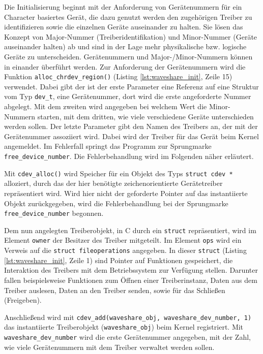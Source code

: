 Die Initialisierung beginnt mit der Anforderung von Gerätenummern für ein Character basiertes Gerät, die dazu genutzt werden den zugehörigen Treiber zu identifizieren sowie die einzelnen Geräte auseinander zu halten. Sie lösen das Konzept von Major-Nummer (Treiberidentifikation) und Minor-Nummer (Geräte auseinander halten) ab und sind in der Lage mehr physikalische bzw. logische Geräte zu unterscheiden. Gerätenummern und Major-/Minor-Nummern können in einander überführt werden. Zur Anforderung der Gerätenummern wird die Funktion \texttt{alloc_chrdev_region()} (Listing \ref{lst:waveshare_init}, Zeile 15) verwendet. Dabei gibt der ist der erste Parameter eine Referenz auf eine Struktur vom Typ \texttt{dev\_t}, eine Gerätenummer, dort wird die erste angeforderte Nummer abgelegt. Mit dem zweiten wird angegeben bei welchem Wert die Minor-Nummern starten, mit dem dritten, wie viele verschiedene Geräte unterschieden werden sollen. Der letzte Parameter gibt den Namen des Treibers an, der mit der Gerätenummer assoziiert wird. Dabei wird der Treiber für das Gerät beim Kernel angemeldet. Im Fehlerfall springt das Programm zur Sprungmarke \texttt{free_device_number}. Die Fehlerbehandlung wird im Folgenden näher erläutert.

Mit \texttt{cdev_alloc()} wird Speicher für ein Objekt des Typs \texttt{struct cdev *} alloziert, durch das der hier benötigte zeichenorientierte Gerätetreiber repräsentiert wird. Wird hier nicht der geforderte Pointer auf das instantiierte Objekt zurückgegeben, wird die Fehlerbehandlung bei der Sprungmarke \texttt{free_device_number} begonnen. 

Dem nun angelegten Treiberobjekt, in C durch ein \texttt{struct} repräsentiert, wird im Element \texttt{owner} der Besitzer des Treiber mitgeteilt. Im Element \texttt{ops} wird ein Verweis auf die \texttt{struct fileoperations} angegeben. In dieser \texttt{struct} (Listing \ref{lst:waveshare_init}, Zeile 1) sind Pointer auf Funktionen gespeichert, die Interaktion des Treibers mit dem Betriebssystem zur Verfügung stellen. Darunter fallen beispielsweise Funktionen zum Öffnen einer Treiberinstanz, Daten aus dem Treiber auslesen, Daten an den Treiber senden, sowie für das Schließen (Freigeben).  

Anschließend wird mit \texttt{cdev_add(waveshare_obj, waveshare_dev_number, 1)} das instantiierte Treiberobjekt (\texttt{waveshare\_obj}) beim Kernel registriert. Mit \texttt{waveshare\_dev\_number} wird die erste Gerätenummer angegeben, mit der Zahl, wie viele Gerätenummern mit dem Treiber verwaltet werden sollen. 

